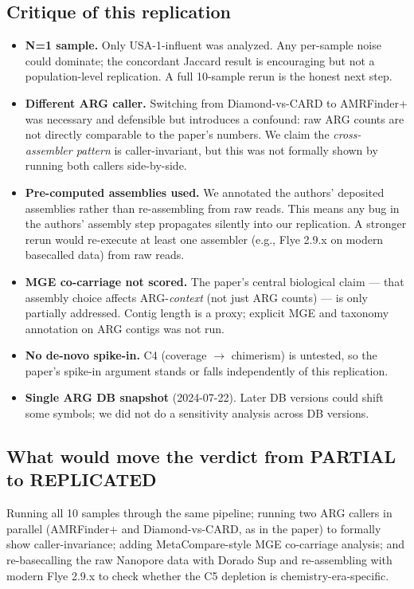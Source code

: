 \documentclass[11pt]{article}
\begin{document}
\subsection*{Critique of this replication}
\begin{itemize}
\item \textbf{N=1 sample.} Only USA-1-influent was analyzed. Any per-sample noise could dominate; the concordant Jaccard result is encouraging but not a population-level replication. A full 10-sample rerun is the honest next step.
\item \textbf{Different ARG caller.} Switching from Diamond-vs-CARD to AMRFinder+ was necessary and defensible but introduces a confound: raw ARG counts are not directly comparable to the paper's numbers. We claim the \textit{cross-assembler pattern} is caller-invariant, but this was not formally shown by running both callers side-by-side.
\item \textbf{Pre-computed assemblies used.} We annotated the authors' deposited assemblies rather than re-assembling from raw reads. This means any bug in the authors' assembly step propagates silently into our replication. A stronger rerun would re-execute at least one assembler (e.g., Flye 2.9.x on modern basecalled data) from raw reads.
\item \textbf{MGE co-carriage not scored.} The paper's central biological claim --- that assembly choice affects ARG-\textit{context} (not just ARG counts) --- is only partially addressed. Contig length is a proxy; explicit MGE and taxonomy annotation on ARG contigs was not run.
\item \textbf{No de-novo spike-in.} C4 (coverage $\to$ chimerism) is untested, so the paper's spike-in argument stands or falls independently of this replication.
\item \textbf{Single ARG DB snapshot} (2024-07-22). Later DB versions could shift some symbols; we did not do a sensitivity analysis across DB versions.
\end{itemize}

\subsection*{What would move the verdict from PARTIAL to REPLICATED}
Running all 10 samples through the same pipeline; running two ARG callers in parallel (AMRFinder+ and Diamond-vs-CARD, as in the paper) to formally show caller-invariance; adding MetaCompare-style MGE co-carriage analysis; and re-basecalling the raw Nanopore data with Dorado Sup and re-assembling with modern Flye 2.9.x to check whether the C5 depletion is chemistry-era-specific.
\end{document}
